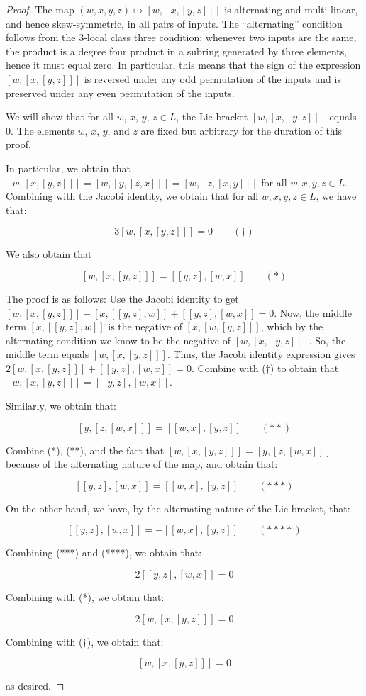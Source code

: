 \begin{proof}
  The map $(w,x,y,z) \mapsto [w,[x,[y,z]]]$ is alternating and
  multi-linear, and hence skew-symmetric, in all pairs of inputs. The
  ``alternating'' condition follows from the $3$-local class three
  condition: whenever two inputs are the same, the product is a degree
  four product in a subring generated by three elements, hence it must
  equal zero. In particular, this means that the sign of the
  expression $[w,[x,[y,z]]]$ is reversed under any odd permutation of
  the inputs and is preserved under any even permutation of the
  inputs.

  We will show that for all $w$, $x$, $y$, $z \in L$, the Lie bracket
  $[w,[x,[y,z]]]$ equals $0$. The elements $w$, $x$, $y$, and $z$ are
  fixed but arbitrary for the duration of this proof.

  
  In particular, we obtain that $[w,[x,[y,z]]] = [w,[y,[z,x]]] =
  [w,[z,[x,y]]]$ for all $w,x,y,z \in L$. Combining with the Jacobi
  identity, we obtain that for all $w,x,y,z \in L$, we have that:

  $$3[w,[x,[y,z]]] = 0 \qquad (\dagger)$$

  We also obtain that 

  $$[w,[x,[y,z]]] = [[y,z],[w,x]] \qquad (*)$$

  The proof is as follows: Use the Jacobi identity to get
  $[w,[x,[y,z]]] + [x,[[y,z],w]] + [[y,z],[w,x]] = 0$. Now, the middle
  term $[x,[[y,z],w]]$ is the negative of $[x,[w,[y,z]]]$, which by
  the alternating condition we know to be the negative of
  $[w,[x,[y,z]]]$. So, the middle term equals $[w,[x,[y,z]]]$. Thus,
  the Jacobi identity expression gives $2[w,[x,[y,z]]] + [[y,z],[w,x]]
  = 0$. Combine with ($\dagger$) to obtain that $[w,[x,[y,z]]] =
  [[y,z],[w,x]]$.

  Similarly, we obtain that:

  $$[y,[z,[w,x]]] = [[w,x],[y,z]] \qquad (**)$$

  Combine (*), (**), and the fact that $[w,[x,[y,z]]] = [y,[z,[w,x]]]$
  because of the alternating nature of the map, and obtain that:

  $$[[y,z],[w,x]] = [[w,x],[y,z]] \qquad (***)$$

  On the other hand, we have, by the alternating nature of the Lie bracket, that:

  $$[[y,z],[w,x]] = -[[w,x],[y,z]] \qquad (****)$$

  Combining (***) and (****), we obtain that:

  $$2[[y,z],[w,x]] = 0$$

  Combining with (*), we obtain that:

  $$2[w,[x,[y,z]]] = 0$$

  Combining with ($\dagger$), we obtain that:

  $$[w,[x,[y,z]]] = 0$$

  as desired.
\end{proof}

